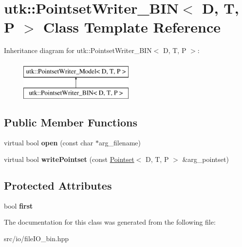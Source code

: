 \hypertarget{classutk_1_1PointsetWriter__BIN}{\section{utk\-:\-:Pointset\-Writer\-\_\-\-B\-I\-N$<$ D, T, P $>$ Class Template Reference}
\label{classutk_1_1PointsetWriter__BIN}
}
Inheritance diagram for utk\-:\-:Pointset\-Writer\-\_\-\-B\-I\-N$<$ D, T, P $>$\-:\begin{figure}[H]
\begin{center}
\leavevmode
\includegraphics[height=2.000000cm]{classutk_1_1PointsetWriter__BIN}
\end{center}
\end{figure}
\subsection*{Public Member Functions}
\begin{DoxyCompactItemize}
\item 
\hypertarget{classutk_1_1PointsetWriter__BIN_ab601f46880ed1824a9847a4f380b32e2}{virtual bool {\bfseries open} (const char $\ast$arg\-\_\-filename)}\label{classutk_1_1PointsetWriter__BIN_ab601f46880ed1824a9847a4f380b32e2}

\item 
\hypertarget{classutk_1_1PointsetWriter__BIN_aa99eb84e54f18d55d217cea0ee53c417}{virtual bool {\bfseries write\-Pointset} (const \hyperlink{classutk_1_1Pointset}{Pointset}$<$ D, T, P $>$ \&arg\-\_\-pointset)}\label{classutk_1_1PointsetWriter__BIN_aa99eb84e54f18d55d217cea0ee53c417}

\end{DoxyCompactItemize}
\subsection*{Protected Attributes}
\begin{DoxyCompactItemize}
\item 
\hypertarget{classutk_1_1PointsetWriter__BIN_add65b1f5d22b5fb9c8e5fd0e3dcaafc0}{bool {\bfseries first}}\label{classutk_1_1PointsetWriter__BIN_add65b1f5d22b5fb9c8e5fd0e3dcaafc0}

\end{DoxyCompactItemize}


The documentation for this class was generated from the following file\-:\begin{DoxyCompactItemize}
\item 
src/io/file\-I\-O\-\_\-bin.\-hpp\end{DoxyCompactItemize}
